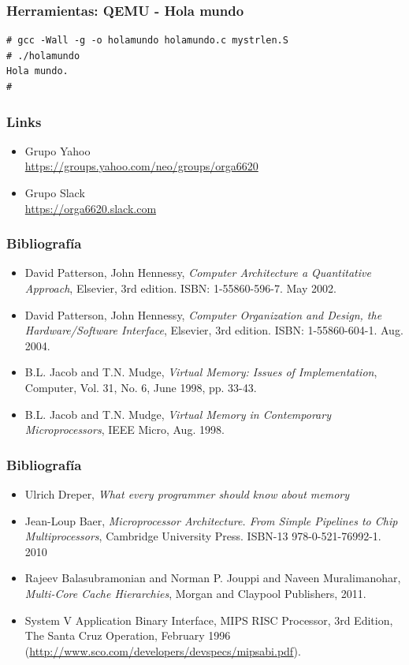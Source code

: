 \documentclass{beamer}
\begin{document}
  \begin{frame}[fragile]
 \frametitle{Herramientas: QEMU - Hola mundo} 

\begin{lstlisting}
# gcc -Wall -g -o holamundo holamundo.c mystrlen.S 
# ./holamundo 
Hola mundo.
# 
\end{lstlisting}
\end{frame}

  
   \begin{frame}
 \frametitle{Links}
 \begin{itemize}
\item Grupo Yahoo \\ \url{https://groups.yahoo.com/neo/groups/orga6620}
\item Grupo Slack \\ \url{https://orga6620.slack.com}
 \end{itemize}
 \end{frame}

\begin{frame}
 \frametitle{Bibliografía}
 \begin{itemize}

\item David Patterson, John Hennessy, \textit{Computer Architecture a Quantitative Approach}, Elsevier, 3rd edition. ISBN: 1-55860-596-7. May 2002.  
  
\item David Patterson, John Hennessy, \textit{Computer Organization and Design, the Hardware/Software Interface},  Elsevier, 3rd edition. ISBN: 1-55860-604-1. Aug. 2004. 
    
\item B.L. Jacob and T.N. Mudge, \textit{Virtual Memory: Issues of Implementation}, Computer, Vol. 31, No. 6, June 1998, pp. 33-43.

\item B.L. Jacob and T.N. Mudge, \textit{Virtual Memory in Contemporary Microprocessors}, IEEE Micro, Aug. 1998.
\end{itemize}

\end{frame}
    
\begin{frame}
 \frametitle{Bibliografía}
 \begin{itemize}

 \item Ulrich Dreper, \textit{What every programmer should know about memory
 }
\item Jean-Loup Baer, \textit{Microprocessor Architecture. From Simple Pipelines to Chip Multiprocessors}, Cambridge University Press. ISBN-13 978-0-521-76992-1. 2010

\item Rajeev Balasubramonian and Norman P. Jouppi and Naveen Muralimanohar, \textit{Multi-Core Cache Hierarchies}, Morgan and Claypool Publishers, 2011.

\item System V Application Binary Interface, MIPS RISC Processor, 3rd Edition, The Santa Cruz Operation, February 1996 (\url{http://www.sco.com/developers/devspecs/mipsabi.pdf}).
\end{itemize}

 \end{frame}
\end{document}

